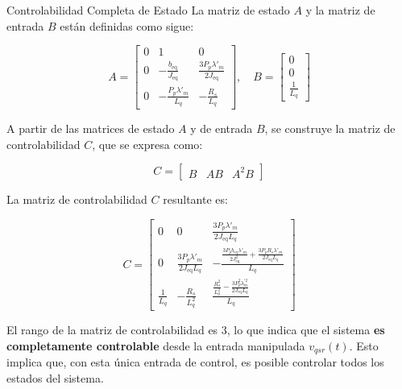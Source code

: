 \documentclass[12pt]{beamer}
\begin{document}
\begin{frame}{Controlabilidad Completa de Estado}\scriptsize
La matriz de estado \( A \) y la matriz de entrada \( B \) están definidas como sigue:

\[
A = \begin{bmatrix}
0 & 1 & 0 \\
0 & -\frac{b_{\text{eq}}}{J_{\text{eq}}} & \frac{3 P_{p} \lambda'_{m}}{2 J_{\text{eq}}} \\
0 & -\frac{P_{p} \lambda'_{m}}{L_q} & -\frac{R_s}{L_q}
\end{bmatrix}, \quad
B = \begin{bmatrix}
0 \\
0 \\
\frac{1}{L_q}
\end{bmatrix}
\]

A partir de las matrices de estado \( A \) y de entrada \( B \), se construye la matriz de controlabilidad \( C \), que se expresa como:

\[
C = \begin{bmatrix}
B & A B & A^2 B
\end{bmatrix}
\]

La matriz de controlabilidad \( C \) resultante es:

\[
C = \begin{bmatrix}
0 & 0 & \frac{3 P_p \lambda'_{m}}{2 J_{\text{eq}} L_q} \\
0 & \frac{3 P_p \lambda'_{m}}{2 J_{\text{eq}} L_q} & -\frac{\frac{3 P_p b_{\text{eq}} \lambda'_{m}}{2 J_{\text{eq}}^2} + \frac{3 P_p R_s \lambda'_{m}}{2 J_{\text{eq}} L_q}}{L_q} \\
\frac{1}{L_q} & -\frac{R_s}{L_q^2} & \frac{\frac{R_s^2}{L_q^2} - \frac{3 P_p^2 \lambda^{'2}_{m}}{2 J_{\text{eq}} L_q}}{L_q}
\end{bmatrix}
\]

El rango de la matriz de controlabilidad es 3, lo que indica que el sistema \textbf{es completamente controlable} desde la entrada manipulada \( v_{qsr}(t) \). Esto implica que, con esta única entrada de control, es posible controlar todos los estados del sistema.
\end{frame}
\end{document}

